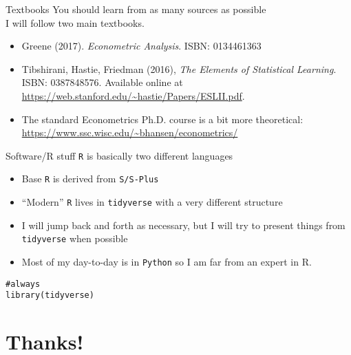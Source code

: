 \documentclass[aspectratio=169]{beamer}
\begin{document}
\begin{frame}[fragile]{Textbooks}
You should learn from as many sources as possible\\
I will follow two main textbooks.
\begin{itemize}
\item Greene (2017). \textit{Econometric Analysis}. ISBN: 0134461363
\item Tibshirani, Hastie, Friedman (2016), \textit{The Elements of Statistical Learning}. ISBN: 0387848576. Available online at \url{https://web.stanford.edu/~hastie/Papers/ESLII.pdf}.
\item The standard Econometrics Ph.D. course is a bit more theoretical: \url{https://www.ssc.wisc.edu/~bhansen/econometrics/}
\end{itemize} 
\end{frame}


\begin{frame}[fragile]{Software/R stuff}
\texttt{R} is basically two different languages
\begin{itemize}
\item Base \texttt{R} is derived from \texttt{S/S-Plus}
\item ``Modern'' \texttt{R} lives in \texttt{tidyverse} with a very different structure
\item I will jump back and forth as necessary, but I will try to present things from \texttt{tidyverse} when possible
\item Most of my day-to-day is in \texttt{Python} so I am far from an expert in R.
\end{itemize}
\begin{verbatim}
#always
library(tidyverse)
\end{verbatim}
\end{frame}


\section*{Thanks!}
\end{document}
